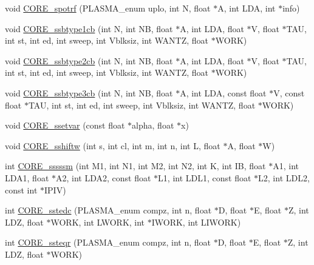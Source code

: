 \begin{DoxyCompactItemize}
\item 
void \hyperlink{group__CORE__float_ga01eafbdf8570f44eadb6403ab7f98882_ga01eafbdf8570f44eadb6403ab7f98882}{C\+O\+R\+E\+\_\+spotrf} (P\+L\+A\+S\+M\+A\+\_\+enum uplo, int N, float $\ast$A, int L\+D\+A, int $\ast$info)
\item 
void \hyperlink{group__CORE__float_gacda54536e899a604d7d846f283028d50_gacda54536e899a604d7d846f283028d50}{C\+O\+R\+E\+\_\+ssbtype1cb} (int N, int N\+B, float $\ast$A, int L\+D\+A, float $\ast$V, float $\ast$T\+A\+U, int st, int ed, int sweep, int Vblksiz, int W\+A\+N\+T\+Z, float $\ast$W\+O\+R\+K)
\item 
void \hyperlink{group__CORE__float_gafde1a736227a2c351c4bfc0eaff5dd72_gafde1a736227a2c351c4bfc0eaff5dd72}{C\+O\+R\+E\+\_\+ssbtype2cb} (int N, int N\+B, float $\ast$A, int L\+D\+A, float $\ast$V, float $\ast$T\+A\+U, int st, int ed, int sweep, int Vblksiz, int W\+A\+N\+T\+Z, float $\ast$W\+O\+R\+K)
\item 
void \hyperlink{group__CORE__float_gaadb348d4a718951b7db0280f5f01c702_gaadb348d4a718951b7db0280f5f01c702}{C\+O\+R\+E\+\_\+ssbtype3cb} (int N, int N\+B, float $\ast$A, int L\+D\+A, const float $\ast$V, const float $\ast$T\+A\+U, int st, int ed, int sweep, int Vblksiz, int W\+A\+N\+T\+Z, float $\ast$W\+O\+R\+K)
\item 
void \hyperlink{group__CORE__float_gad27978427a8bb71eab8f3ab5bd338c52_gad27978427a8bb71eab8f3ab5bd338c52}{C\+O\+R\+E\+\_\+ssetvar} (const float $\ast$alpha, float $\ast$x)
\item 
void \hyperlink{group__CORE__float_ga105b71eebe0c92761d20a42f74be1865_ga105b71eebe0c92761d20a42f74be1865}{C\+O\+R\+E\+\_\+sshiftw} (int s, int cl, int m, int n, int L, float $\ast$A, float $\ast$W)
\item 
int \hyperlink{group__CORE__float_gab9a94e193dfc65cd359f751cdf232e54_gab9a94e193dfc65cd359f751cdf232e54}{C\+O\+R\+E\+\_\+sssssm} (int M1, int N1, int M2, int N2, int K, int I\+B, float $\ast$A1, int L\+D\+A1, float $\ast$A2, int L\+D\+A2, const float $\ast$L1, int L\+D\+L1, const float $\ast$L2, int L\+D\+L2, const int $\ast$I\+P\+I\+V)
\item 
int \hyperlink{group__CORE__float_ga76750d0540f6094e5a777ea19b2cee02_ga76750d0540f6094e5a777ea19b2cee02}{C\+O\+R\+E\+\_\+sstedc} (P\+L\+A\+S\+M\+A\+\_\+enum compz, int n, float $\ast$D, float $\ast$E, float $\ast$Z, int L\+D\+Z, float $\ast$W\+O\+R\+K, int L\+W\+O\+R\+K, int $\ast$I\+W\+O\+R\+K, int L\+I\+W\+O\+R\+K)
\item 
int \hyperlink{group__CORE__float_ga66cd3771abf469dccce1948f0f84eb47_ga66cd3771abf469dccce1948f0f84eb47}{C\+O\+R\+E\+\_\+ssteqr} (P\+L\+A\+S\+M\+A\+\_\+enum compz, int n, float $\ast$D, float $\ast$E, float $\ast$Z, int L\+D\+Z, float $\ast$W\+O\+R\+K)

\end{DoxyCompactItemize}
